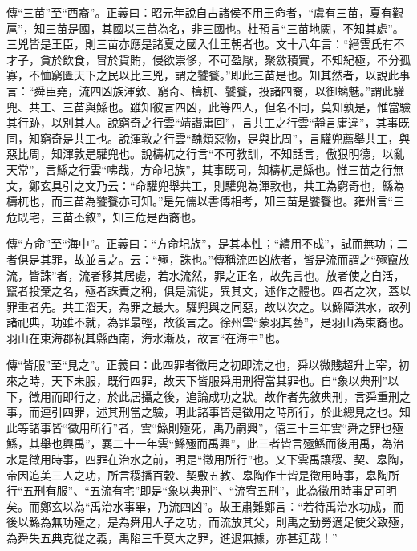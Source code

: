 {\noindent\zhuan{}\fzbyks 傳“三苗”至“西裔”。正義曰：昭元年說自古諸侯不用王命者，“虞有三苗，夏有觀扈”，知三苗是國，其國以三苗為名，非三國也。杜預言“三苗地闕，不知其處”。三兇皆是王臣，則三苗亦應是諸夏之國入仕王朝者也。文十八年言：“縉雲氏有不才子，貪於飲食，冒於貨賄，侵欲崇侈，不可盈厭，聚斂積實，不知紀極，不分孤寡，不恤窮匱天下之民以比三兇，謂之饕餮。”即此三苗是也。知其然者，以說此事言：“舜臣堯，流四凶族渾敦、窮奇、檮杌、饕餮，投諸四裔，以御螭魅。”謂此驩兜、共工、三苗與鯀也。雖知彼言四凶，此等四人，但名不同，莫知孰是，惟當驗其行跡，以別其人。說窮奇之行雲“靖譖庸回”，言共工之行雲“靜言庸違”，其事既同，知窮奇是共工也。說渾敦之行雲“醜類惡物，是與比周”，言驩兜薦舉共工，與惡比周，知渾敦是驩兜也。說檮杌之行言“不可教訓，不知話言，傲狠明德，以亂天常”，言鯀之行雲“咈哉，方命圮族”，其事既同，知檮杌是鯀也。惟三苗之行無文，鄭玄具引之文乃云：“命驩兜舉共工，則驩兜為渾敦也，共工為窮奇也，鯀為檮杌也，而三苗為饕餮亦可知。”是先儒以書傳相考，知三苗是饕餮也。雍州言“三危既宅，三苗丕敘”，知三危是西裔也。 \par}

{\noindent\zhuan{}\fzbyks 傳“方命”至“海中”。正義曰：“方命圮族”，是其本性；“績用不成”，試而無功；二者俱是其罪，故並言之。云：“殛，誅也。”傳稱流四凶族者，皆是流而謂之“殛竄放流，皆誅”者，流者移其居處，若水流然，罪之正名，故先言也。放者使之自活，竄者投棄之名，殛者誅責之稱，俱是流徙，異其文，述作之體也。四者之次，蓋以罪重者先。共工滔天，為罪之最大。驩兜與之同惡，故以次之。以鯀障洪水，故列諸祀典，功雖不就，為罪最輕，故後言之。徐州雲“蒙羽其藝”，是羽山為東裔也。羽山在東海郡祝其縣西南，海水漸及，故言“在海中”也。 \par}

{\noindent\zhuan{}\fzbyks 傳“皆服”至“見之”。正義曰：此四罪者徵用之初即流之也，舜以微賤超升上宰，初來之時，天下未服，既行四罪，故天下皆服舜用刑得當其罪也。自“象以典刑”以下，徵用而即行之，於此居攝之後，追論成功之狀。故作者先敘典刑，言舜重刑之事，而連引四罪，述其刑當之驗，明此諸事皆是徵用之時所行，於此總見之也。知此等諸事皆“徵用所行”者，雲“鯀則殛死，禹乃嗣興”，僖三十三年雲“舜之罪也殛鯀，其舉也興禹”，襄二十一年雲“鯀殛而禹興”，此三者皆言殛鯀而後用禹，為治水是徵用時事，四罪在治水之前，明是“徵用所行”也。又下雲禹讓稷、契、皋陶，帝因追美三人之功，所言稷播百穀、契敷五教、皋陶作士皆是徵用時事，皋陶所行“五刑有服”、“五流有宅”即是“象以典刑”、“流宥五刑”，此為徵用時事足可明矣。而鄭玄以為“禹治水事畢，乃流四凶”。故王肅難鄭言：“若待禹治水功成，而後以鯀為無功殛之，是為舜用人子之功，而流放其父，則禹之勤勞適足使父致殛，為舜失五典克從之義，禹陷三千莫大之罪，進退無據，亦甚迂哉！” \par}

